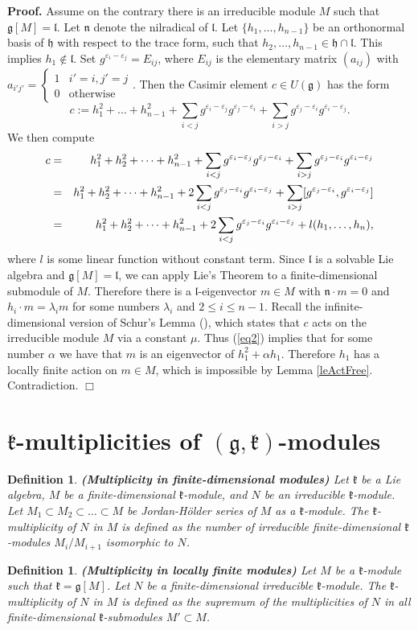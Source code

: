 \documentclass[12pt]{report}
\newenvironment{proof}[1][]{ \textbf{Proof#1. }}{$\Box$\medskip}
\newtheorem{defi}[theo]{Definition}
\newcommand{\kk}{\mathfrak{k}}
\newcommand{\nn}{\mathfrak{n}}
\newcommand{\hh}{\mathfrak{h}}
\newcommand{\gG}{\mathfrak{g}}
\newcommand{\lL}{\mathfrak{l}}
\newcommand{\doublebrace}[4]{\left\{\begin{array}{ll}#1 & #2 \\ #3 & #4\end{array}\right.}
\newcommand{\refeq}[1]{(\ref{#1})}
\newcommand{\eps}{\varepsilon}
\begin{document}
\begin{proof}
Assume on the contrary there is an irreducible module $M$ such that $\gG[M]=\lL$. Let $\nn$ denote the nilradical of $\lL$. Let  $\{h_1,\dots,h_{n-1}\}$ be an orthonormal basis of $\hh$ with respect to the trace form, such that $h_2,\dots, h_{n-1}\in\hh\cap\lL$. This implies $h_1\notin \lL$. Set $g^{\eps_i-\eps_j}=E_{ij}$, where $E_{ij}$ is the elementary matrix $(a_{ij})$ with $a_{i'j'}=\doublebrace{1}{i'=i, j'=j}{0}{\mathrm{otherwise}}$. Then the Casimir element $c\in U(\gG)$ has the form
\[
c:=h_1^2+\dots +h_{n-1}^2+\sum_{i<j}g^{\eps_i-\eps_j}g^{\eps_j-\eps_i}+\sum_{i>j}g^{\eps_j-\eps_i}g^{\eps_i-\eps_j}.
\]
We then compute
\begin{eqnarray}\label{eq2}
c&=&h_1^2+h_2^2+\dots+h_{n-1}^2+\sum_{i<j}g^{\eps_i-\eps_j}g^{\eps_j-\eps_i}+\sum_{i>j}g^{\eps_j-\eps_i}g^{\eps_i-\eps_j}\notag\\
&=&h_1^2+h_2^2+\dots+h_{n-1}^2+2\sum_{i<j}g^{\eps_j-\eps_i}g^{\eps_i-\eps_j}+\sum_{i>j}[g^{\eps_j-\eps_i},g^{\eps_i-\eps_j}]\notag\\
&=&h_1^2+h_2^2+\dots+h_{n-1}^2+2\sum_{i<j}g^{\eps_j-\eps_i}g^{\eps_i-\eps_j}+l(h_1,\dots,h_n),
\end{eqnarray}
where $l$ is some linear function without constant term. Since $\lL$ is a solvable Lie algebra and $\gG[M]=\lL$, we can apply Lie's Theorem to a finite-dimensional submodule of $M$. Therefore there is a $\lL$-eigenvector $m\in M$ with $\nn\cdot m =0$ and $h_i\cdot m=\lambda_im$ for some numbers $\lambda_i$ and $2\leq i\leq n-1$. Recall the infinite-dimensional version of Schur's Lemma (\cite[2.6.8]{Dixmier}), which states that $c$ acts on the irreducible module $M$ via a constant $\mu$. Thus \refeq{eq2} implies that for some number $\alpha$ we have that $m$ is an eigenvector of $h_1^2+\alpha h_1$. Therefore $h_1$ has a locally finite action on $m\in M$, which is impossible by Lemma \ref{leActFree}. Contradiction.
\end{proof}

\section{$\kk$-multiplicities of $(\gG,\kk)$-modules}
\begin{defi} \textbf{(Multiplicity in finite-dimensional modules)}
Let $\kk$ be a Lie algebra, $M$ be a finite-dimensional $\kk$-module, and $N$ be an irreducible $\kk$-module. Let $M_1\subset M_2\subset\dots\subset M$ be  Jordan-H\"older series of $M$ as a $\kk$-module. The $\kk$-multiplicity of $N$ in $M$ is defined as the number of irreducible finite-dimensional $\kk$-modules $M_i/M_{i+1}$ isomorphic to $N$.
\end{defi}
\begin{defi}\textbf{(Multiplicity in locally finite modules)}
Let $M$ be a $\kk$-module such that $\kk=\gG[M]$. Let $N$ be a finite-dimensional irreducible $\kk$-module. The $\kk$-multiplicity of $N$ in $M$ is defined as the supremum of the multiplicities of $N$ in all finite-dimensional $\kk$-submodules $M'\subset M$.
\end{defi}
\end{document}
